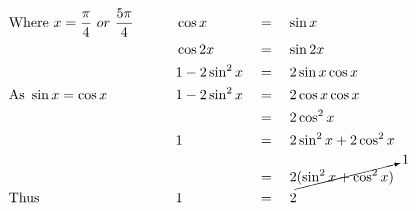 \begin{alignat*}{3}
&\mathrm{Where}~x=\frac{\pi}{4}~or~\frac{5\pi}{4}\qquad&&\cos{x}&&=\quad\sin{x}\\
&\,&&\cos{2x}&&=\quad\sin{2x}\\
&\,&&1-2\sin^2{x}&&=\quad2\sin{x}\cos{x}\\
&\mathrm{As}~\sin{x}=\cos{x}\qquad&&1-2\sin^2{x}&&=\quad2\cos{x}\cos{x}\\
&\,&&\,&&=\quad2\cos^2{x}\\
&\,&&1&&=\quad2\sin^2{x}+2\cos^2{x}\\
&\,&&\,&&=\quad2\cancelto{1}{(\sin^2{x+\cos^2{x}})}\\
&\mathrm{Thus}&&1&&=\quad2
\end{alignat*}
